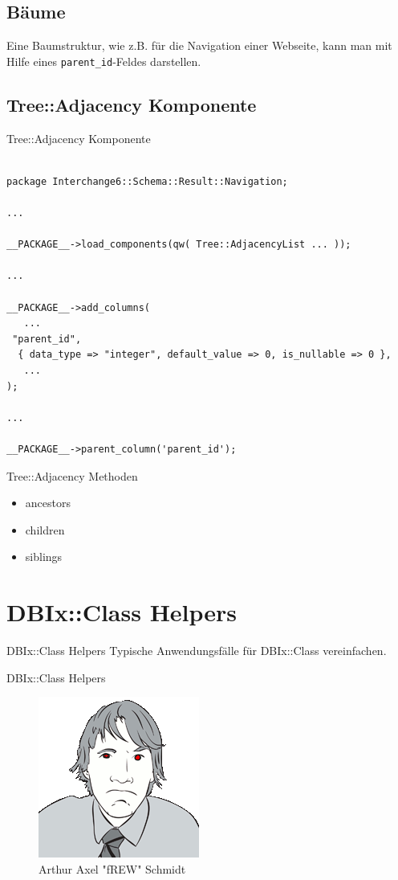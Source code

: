 \subsection{Bäume}

Eine Baumstruktur, wie z.B. für die Navigation einer
Webseite, kann man mit Hilfe eines \verb|parent_id|-Feldes
darstellen.

\subsection{Tree::Adjacency Komponente}

\begin{frame}[fragile]{Tree::Adjacency Komponente}
\begin{lstlisting}

package Interchange6::Schema::Result::Navigation;

...

__PACKAGE__->load_components(qw( Tree::AdjacencyList ... ));

...

__PACKAGE__->add_columns(
   ...
 "parent_id",
  { data_type => "integer", default_value => 0, is_nullable => 0 },
   ...
);

...

__PACKAGE__->parent_column('parent_id');

\end{lstlisting}
\end{frame}

\begin{frame}{Tree::Adjacency Methoden}
\begin{itemize}
\item ancestors
\item children
\item siblings
\end{itemize}
\end{frame}

\section{DBIx::Class Helpers}

\begin{frame}{DBIx::Class Helpers}
Typische Anwendungsfälle für DBIx::Class vereinfachen.
\end{frame}

\begin{frame}{DBIx::Class Helpers}
\begin{figure}[!ht]
\centering
\includegraphics[width=0.4\linewidth]{img/frew.png}
\caption{Arthur Axel "fREW" Schmidt}
\end{figure}
\end{frame}

